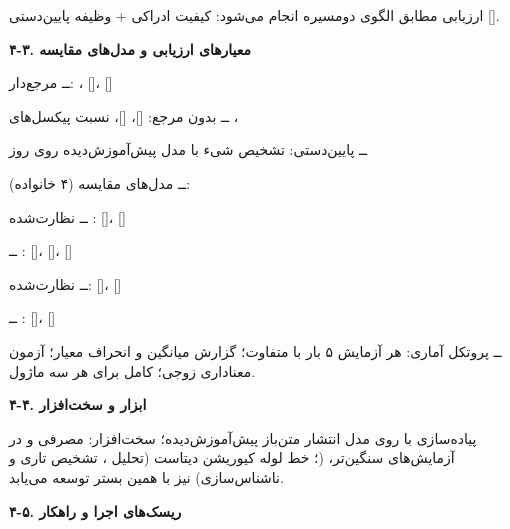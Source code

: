 \documentclass[12pt,a4paper]{article}
\begin{document}
ارزیابی مطابق الگوی دومسیره  انجام می‌شود: کیفیت ادراکی + وظیفه پایین‌دستی [].\par
\textbf{۴-۳. معیارهای ارزیابی و مدل‌های مقایسه}\par
ــ مرجع‌دار: ،  []،  []\par
ــ بدون مرجع:  []،  []، نسبت پیکسل‌های ، \par
ــ پایین‌دستی:  تشخیص شیء با مدل  پیش‌آموزش‌دیده روی روز\par
ــ مدل‌های مقایسه (۴ خانواده):\par
ــ نظارت‌شده :  []،  []\par
ــ :  []،  []،  []\par
ــ  نظارت‌شده:  []،  []\par
ــ  :    []،    []\par
ــ پروتکل آماری: هر آزمایش ۵ بار با  متفاوت؛ گزارش میانگین و انحراف معیار؛ آزمون معناداری زوجی؛  کامل برای هر سه ماژول.\par
\textbf{۴-۴. ابزار و سخت‌افزار}\par
پیاده‌سازی با  روی مدل انتشار متن‌باز پیش‌آموزش‌دیده؛ سخت‌افزار:  مصرفی   و در آزمایش‌های سنگین‌تر،   (؛ خط لوله کیوریشن دیتاست (تحلیل ، تشخیص تاری و ناشناس‌سازی) نیز با همین بستر توسعه می‌یابد.\par
\textbf{۴-۵. ریسک‌های اجرا و راهکار}\par
\end{document}
